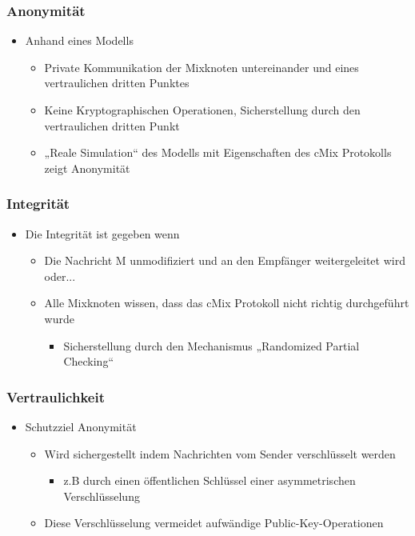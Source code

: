\documentclass[t, xcolor=dvipsnames]{beamer}
\begin{document}
\begin{frame}
	\frametitle{Anonymität}
	\begin{itemize}
		\item Anhand eines Modells
			\begin{itemize}
				\item Private Kommunikation der Mixknoten untereinander und eines vertraulichen dritten Punktes
				\item Keine Kryptographischen Operationen, Sicherstellung durch den vertraulichen dritten Punkt
				\item „Reale Simulation“ des Modells mit Eigenschaften des cMix Protokolls zeigt Anonymität
			\end{itemize}
	\end{itemize}
	\vspace{\fill}
\end{frame}

\begin{frame}
	\frametitle{Integrität}
	\begin{itemize}
		\item Die Integrität ist gegeben wenn
			\begin{itemize}
				\item Die Nachricht M unmodifiziert und an den Empfänger weitergeleitet wird oder...
				\item Alle Mixknoten wissen, dass das cMix Protokoll nicht richtig durchgeführt wurde
					\begin{itemize}
						\item Sicherstellung durch den Mechanismus „Randomized Partial Checking“
					\end{itemize}
			\end{itemize}
	\end{itemize}
	\vspace{\fill}
\end{frame}

\begin{frame}
	\frametitle{Vertraulichkeit}
	\begin{itemize}
		\item Schutzziel Anonymität
			\begin{itemize}
				\item Wird sichergestellt indem Nachrichten vom Sender verschlüsselt werden
					\begin{itemize}
						\item z.B durch einen öffentlichen Schlüssel einer asymmetrischen Verschlüsselung
					\end{itemize}
				\item Diese Verschlüsselung vermeidet aufwändige Public-Key-Operationen 
			\end{itemize}
	\end{itemize}
	\vspace{\fill}
\end{frame}
\end{document}
